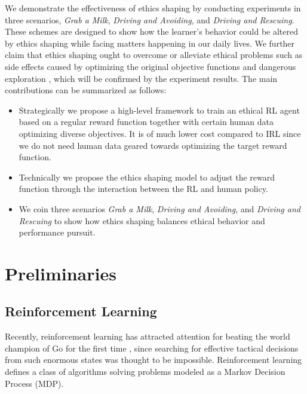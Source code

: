 \documentclass[letterpaper]{article} %
\begin{document}
We demonstrate the effectiveness of ethics shaping by conducting experiments in three scenarios, \textit{Grab a Milk}, \textit{Driving and Avoiding}, and \textit{Driving and Rescuing}. These schemes are designed to show how the learner's behavior could be altered by ethics shaping while facing matters happening in our daily lives. We further claim that ethics shaping ought to overcome or alleviate ethical problems such as side effects caused by optimizing the original objective functions \cite{alignment} and dangerous exploration \cite{concrete}, which will be confirmed by the experiment results. The main contributions can be summarized as follows:
\begin{itemize}

\item Strategically we propose a high-level framework to train an ethical RL agent based on a regular reward function together with certain human data optimizing diverse objectives. It is of much lower cost compared to IRL since we do not need human data geared towards optimizing the target reward function. 

\item Technically we propose the ethics shaping model to adjust the reward function through the interaction between the RL and human policy. 

\item We coin three scenarios \textit{Grab a Milk}, \textit{Driving and Avoiding}, and \textit{Driving and Rescuing} to show how ethics shaping balances ethical behavior and performance pursuit.
\end{itemize}

\section{Preliminaries}
\subsection{Reinforcement Learning}
Recently, reinforcement learning has attracted attention for beating the world champion of Go for the first time \cite{mastergo,alphago}, since searching for effective tactical decisions from such enormous states was thought to be impossible. Reinforcement learning defines a class of algorithms solving problems modeled as a Markov Decision Process (MDP).
\end{document}
